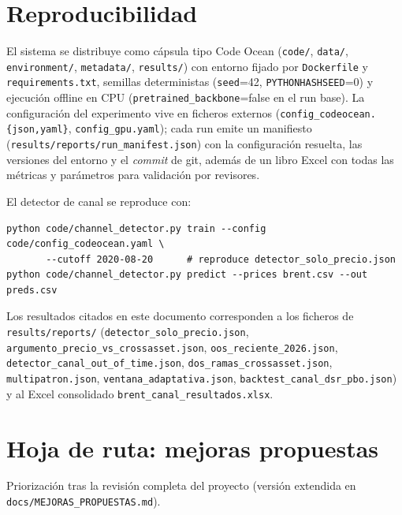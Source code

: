 \documentclass[11pt,a4paper]{article}
\begin{document}
\section{Reproducibilidad}
\label{ap:repro}
El sistema se distribuye como cápsula tipo Code Ocean
(\texttt{code/}, \texttt{data/}, \texttt{environment/}, \texttt{metadata/},
\texttt{results/}) con entorno fijado por \texttt{Dockerfile} y
\texttt{requirements.txt}, semillas deterministas (\texttt{seed}=42,
\texttt{PYTHONHASHSEED}=0) y ejecución offline en CPU
(\texttt{pretrained\_backbone}=false en el run base). La configuración del
experimento vive en ficheros externos (\texttt{config\_codeocean.\{json,yaml\}},
\texttt{config\_gpu.yaml}); cada run emite un manifiesto
(\texttt{results/reports/run\_manifest.json}) con la configuración resuelta, las
versiones del entorno y el \emph{commit} de git, además de un libro Excel con
todas las métricas y parámetros para validación por revisores.

El detector de canal se reproduce con:
\begin{verbatim}
python code/channel_detector.py train --config code/config_codeocean.yaml \
       --cutoff 2020-08-20      # reproduce detector_solo_precio.json
python code/channel_detector.py predict --prices brent.csv --out preds.csv
\end{verbatim}
Los resultados citados en este documento corresponden a los ficheros de
\texttt{results/reports/} (\texttt{detector\_solo\_precio.json},
\texttt{argumento\_precio\_vs\_crossasset.json},
\texttt{oos\_reciente\_2026.json}, \texttt{detector\_canal\_out\_of\_time.json},
\texttt{dos\_ramas\_crossasset.json}, \texttt{multipatron.json},
\texttt{ventana\_adaptativa.json}, \texttt{backtest\_canal\_dsr\_pbo.json}) y al
Excel consolidado \texttt{brent\_canal\_resultados.xlsx}.

\section{Hoja de ruta: mejoras propuestas}
\label{ap:mejoras}
Priorización tras la revisión completa del proyecto (versión extendida en
\texttt{docs/MEJORAS\_PROPUESTAS.md}).
\end{document}
